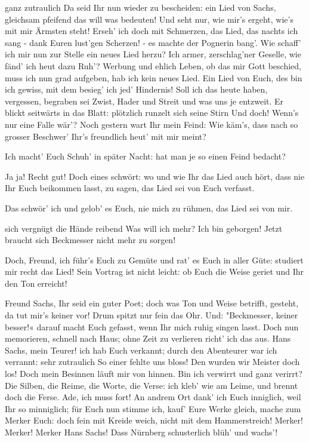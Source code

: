 \begin{drama}
\Beckmesserspeaks
ganz zutraulich
Da seid Ihr nun wieder zu bescheiden:
ein Lied von Sachs,
gleichsam pfeifend
das will was bedeuten!
Und seht nur, wie mir's ergeht,
wie's mit mir Ärmsten steht!
Erseh' ich doch mit Schmerzen,
das Lied, das nachts ich sang -
dank Euren lust'gen Scherzen! -
es machte der Pognerin bang'.
Wie schaff' ich mir nun zur Stelle
ein neues Lied herzu?
Ich armer, zerschlag'ner Geselle,
wie fänd' ich heut dazu Ruh'?
Werbung und ehlich Leben,
ob das mir Gott beschied,
muss ich nun grad aufgeben,
hab ich kein neues Lied.
Ein Lied von Euch, des bin ich gewiss,
mit dem besieg' ich jed' Hindernis!
Soll ich das heute haben,
vergessen, begraben
sei Zwist, Hader und Streit
und was uns je entzweit.
Er blickt seitwärts in das Blatt: plötzlich runzelt sich seine Stirn
Und doch! Wenn's nur eine Falle wär'?
Noch gestern wart Ihr mein Feind:
Wie käm's, dass nach so grosser Beschwer'
Ihr's freundlich heut' mit mir meint?

\Sachsspeaks
Ich macht' Euch Schuh' in später Nacht:
hat man je so einen Feind bedacht?

\Beckmesserspeaks
Ja ja! Recht gut! Doch eines schwört:
wo und wie Ihr das Lied auch hört,
dass nie Ihr Euch beikommen lasst,
zu sagen, das Lied sei von Euch verfasst.

\Sachsspeaks
Das schwör' ich und gelob' es Euch,
nie mich zu rühmen, das Lied sei von mir.

\Beckmesserspeaks
sich vergnügt die Hände reibend
Was will ich mehr? Ich bin geborgen!
Jetzt braucht sich Beckmesser nicht mehr zu sorgen!

\Sachsspeaks
Doch, Freund, ich führ's Euch zu Gemüte
und rat' es Euch in aller Güte:
studiert mir recht das Lied!
Sein Vortrag ist nicht leicht:
ob Euch die Weise geriet
und Ihr den Ton erreicht!

\Beckmesserspeaks
Freund Sachs, Ihr seid ein guter Poet;
doch was Ton und Weise betrifft,
gesteht, da tut mir's keiner vor!
Drum spitzt nur fein das Ohr.
Und:
"Beckmesser, keiner besser!«
darauf macht Euch gefasst,
wenn Ihr mich ruhig singen lasst.
Doch nun memorieren,
schnell nach Haus;
ohne Zeit zu verlieren
richt' ich das aus.
Hans Sachs, mein Teurer!
ich hab Euch verkannt;
durch den Abenteurer
war ich verrannt:
sehr zutraulich
So einer fehlte uns bloss!
Den wurden wir Meister doch los!
Doch mein Besinnen
läuft mir von hinnen.
Bin ich verwirrt
und ganz verirrt?
Die Silben, die Reime,
die Worte, die Verse:
ich kleb' wie am Leime,
und brennt doch die Ferse.
Ade, ich muss fort!
An andrem Ort
dank' ich Euch inniglich,
weil Ihr so minniglich;
für Euch nun stimme ich,
kauf' Eure Werke gleich,
mache zum Merker Euch:
doch fein mit Kreide weich,
nicht mit dem Hammerstreich!
Merker! Merker! Merker Hans Sachs!
Dass Nürnberg schusterlich blüh' und wachs'!


\end{drama}
